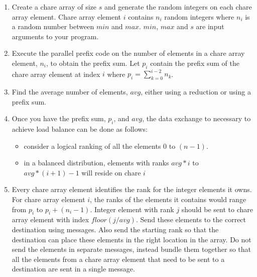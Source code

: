 \documentclass{article}
\begin{document}
\begin{enumerate}

\item Create a chare array of size $s$ and generate the random integers on
each chare array element. Chare array element $i$ contains $n_i$ random integers
where $n_i$ is a random number between $min$ and $max$. $min$,
$max$ and $s$ are input arguments to your program.

\item Execute the parallel prefix code on the number of elements in a chare array
element, $n_i$, to obtain the prefix sum. Let $p_i$ contain the prefix sum of the
chare array element at index $i$ where $p_i = \sum\limits_{k=0}^{i-2} n_k$.

\item Find the average number of elements, $avg$, either using a reduction or using a prefix sum.

\item Once you have the prefix sum, $p_i$, and $avg$, the data exchange to necessary to achieve load
balance can be done as follows:
\begin{itemize}
\item consider a logical ranking of all the elements $0$ to $(n-1)$.
\item in a balanced distribution, elements with ranks $avg*i$ to $avg*(i +1)-1$ will reside on chare $i$
\end{itemize}


\item Every chare array element identifies the rank for the integer elements it
owns. For chare array element $i$, the ranks of the elements it contains would
range from $p_i$ to $p_i + (n_i - 1)$. Integer element with rank $j$ should be
sent to chare array element with index $floor(j/avg)$. Send these elements to
the correct destination using messages. Also send the starting rank so that the
destination can place these elements in the right location in the array. Do not
send the elements in separate messages, instead bundle them together so that
all the elements from a chare array element that need to be sent to a
destination are sent in a single message.


\end{enumerate}
\end{document}
